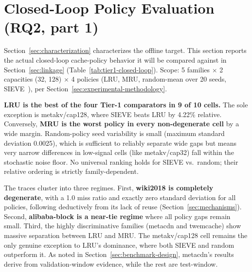 \section{Closed-Loop Policy Evaluation (RQ2, part 1)}
\label{sec:closed-loop}

\begin{sloppypar}
Section~\ref{sec:characterization} characterizes the offline target.
This section reports the actual closed-loop cache-policy behavior it will
be compared against in Section~\ref{sec:linkage}
(Table~\ref{tab:tier1-closed-loop}). Scope: 5 families
$\times$ 2 capacities (32, 128) $\times$ 4 policies (LRU, MRU, random-mean
over 20 seeds, SIEVE~\cite{zhang2024sieve}), per
Section~\ref{sec:experimental-methodology}.
\end{sloppypar}



\textbf{LRU is the best of the four Tier-1 comparators in 9 of 10 cells.}
The sole exception is metakv/cap128, where SIEVE beats LRU by 4.22\% relative.
Conversely,
\textbf{MRU is the worst policy in every non-degenerate cell} by a wide
margin. Random-policy seed variability is small (maximum standard
deviation 0.0025), which is sufficient to reliably separate wide gaps but
means very narrow differences in low-signal cells (like metakv/cap32) fall within
the stochastic noise floor. No universal ranking holds for SIEVE vs.\ random;
their relative ordering is strictly family-dependent.

The traces cluster into three regimes. First, \textbf{wiki2018 is completely degenerate},
with a 1.0 miss ratio and exactly zero standard deviation for all policies, following
deductively from its lack of reuse (Section~\ref{sec:mechanisms}). Second,
\textbf{alibaba-block is a near-tie regime} where all policy gaps remain small. Third,
the highly discriminative families (metacdn and twemcache) show massive separation
between LRU and MRU. The metakv/cap128 cell remains the only genuine exception to LRU's
dominance, where both SIEVE and random outperform it. As noted in Section~\ref{sec:benchmark-design},
metacdn's results derive from validation-window evidence, while the rest are
test-window.

